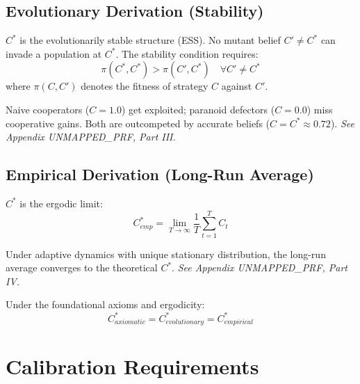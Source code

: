 \subsection{Evolutionary Derivation (Stability)}
\label{sec:ch6-evolutionary}

$C^*$ is the evolutionarily stable structure (ESS). No mutant belief $C' \neq C^*$
can invade a population at $C^*$. The stability condition requires:
\begin{equation}
\label{eq:cstar-ess}
\pi(C^*, C^*) > \pi(C', C^*) \quad \forall C' \neq C^*
\end{equation}
where $\pi(C, C')$ denotes the fitness of strategy $C$ against $C'$.

Naive cooperators ($C = 1.0$) get exploited; paranoid defectors ($C = 0.0$)
miss cooperative gains. Both are outcompeted by accurate beliefs ($C = C^* \approx 0.72$).
\emph{See Appendix UNMAPPED_PRF, Part III.}

\subsection{Empirical Derivation (Long-Run Average)}
\label{sec:ch6-empirical}

$C^*$ is the ergodic limit:
\begin{equation}
\label{eq:cstar-ergodic}
C^*_{emp} = \lim_{T\to\infty} \frac{1}{T}\sum_{t=1}^{T} C_t
\end{equation}

Under adaptive dynamics with unique stationary distribution, the long-run
average converges to the theoretical $C^*$.
\emph{See Appendix UNMAPPED_PRF, Part IV.}

\begin{theorem}
\label{thm:cstar-convergence}
Under the foundational axioms and ergodicity:
\begin{equation}
\label{eq:cstar-convergence}
C^*_{axiomatic} = C^*_{evolutionary} = C^*_{empirical}
\end{equation}
\end{theorem}



\section{Calibration Requirements}
\label{sec:cstar-calibration}

